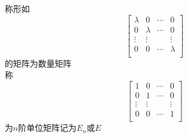 \begin{enumerate}
{        称形如
        $$
        \left[ \begin{matrix}
            \lambda  & 0 & \cdots  & 0  \\
            0 & \lambda  & \cdots  & 0  \\
            \vdots  & \vdots  & {} & \vdots   \\
            0 & 0 & \cdots  & \lambda   \\         
        \end{matrix} \right]
        $$
        的矩阵为{\color{blue}数量矩阵\quad} \\
        称
        $$
        \left[ \begin{matrix}
            1 & 0 & \cdots  & 0  \\
            0 & 1 & \cdots  & 0  \\
            \vdots  & \vdots  & {} & \vdots   \\
            0 & 0 & \cdots  & 1  \\
        \end{matrix} \right]
        $$
        为$n$阶{\color{blue}单位矩阵\quad}记为$E_n$或$E$
    }
\end{enumerate}

